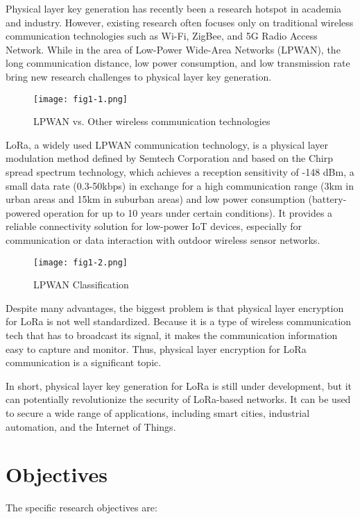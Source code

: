 Physical layer key generation has recently been a research hotspot in academia and industry\cite{7120014}. However, existing research often focuses only on traditional wireless communication technologies such as Wi-Fi, ZigBee, and 5G Radio Access Network. While in the area of Low-Power Wide-Area Networks (LPWAN)\cite{iotfactorylpwan}, the long communication distance, low power consumption, and low transmission rate bring new research challenges to physical layer key generation.
\begin{figure}
  \centering
  \texttt{[image: fig1-1.png]}
  \caption{LPWAN vs. Other wireless communication technologies\cite{iotfactorylpwan}}
  \label{fig:1-1}
\end{figure}
LoRa, a widely used LPWAN communication technology, is a physical layer modulation method defined by Semtech Corporation and based on the Chirp spread spectrum technology, which achieves a reception sensitivity of -148 dBm, a small data rate (0.3-50kbps) in exchange for a high communication range (3km in urban areas and 15km in suburban areas) and low power consumption (battery-powered operation for up to 10 years under certain conditions)\cite{lorawanpara}. It provides a reliable connectivity solution for low-power IoT devices, especially for communication or data interaction with outdoor wireless sensor networks.
\begin{figure}
  \centering
  \texttt{[image: fig1-2.png]}
  \caption{LPWAN Classification}
  \label{fig:1-2}
\end{figure}
Despite many advantages, the biggest problem is that physical layer encryption for LoRa is not well standardized. Because it is a type of wireless communication tech that has to broadcast its signal, it makes the communication information easy to capture and monitor. Thus, physical layer encryption for LoRa communication is a significant topic. 

In short, physical layer key generation for LoRa is still under development, but it can potentially revolutionize the security of LoRa-based networks. It can be used to secure a wide range of applications, including smart cities, industrial automation, and the Internet of Things.

\section{Objectives}

The specific research objectives are:


